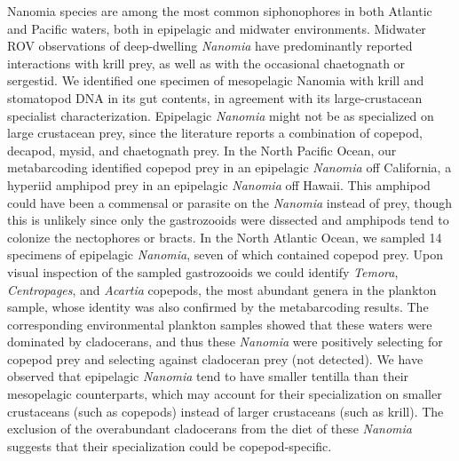 \documentclass[12pt,]{article}
\begin{document}
Nanomia species are among the most common siphonophores in both Atlantic and Pacific waters, both in epipelagic and midwater environments. Midwater ROV observations of deep-dwelling \emph{Nanomia} have predominantly reported interactions with krill prey, as well as with the occasional chaetognath or sergestid. We identified one specimen of mesopelagic Nanomia with krill and stomatopod DNA in its gut contents, in agreement with its large-crustacean specialist characterization. Epipelagic \emph{Nanomia} might not be as specialized on large crustacean prey, since the literature reports a combination of copepod, decapod, mysid, and chaetognath prey. In the North Pacific Ocean, our metabarcoding identified copepod prey in an epipelagic \emph{Nanomia} off California, a hyperiid amphipod prey in an epipelagic \emph{Nanomia} off Hawaii. This amphipod could have been a commensal or parasite on the \emph{Nanomia} instead of prey, though this is unlikely since only the gastrozooids were dissected and amphipods tend to colonize the nectophores or bracts. In the North Atlantic Ocean, we sampled 14 specimens of epipelagic \emph{Nanomia}, seven of which contained copepod prey. Upon visual inspection of the sampled gastrozooids we could identify \emph{Temora}, \emph{Centropages}, and \emph{Acartia} copepods, the most abundant genera in the plankton sample, whose identity was also confirmed by the metabarcoding results. The corresponding environmental plankton samples showed that these waters were dominated by cladocerans, and thus these \emph{Nanomia} were positively selecting for copepod prey and selecting against cladoceran prey (not detected). We have observed that epipelagic \emph{Nanomia} tend to have smaller tentilla than their mesopelagic counterparts, which may account for their specialization on smaller crustaceans (such as copepods) instead of larger crustaceans (such as krill). The exclusion of the overabundant cladocerans from the diet of these \emph{Nanomia} suggests that their specialization could be copepod-specific.
\end{document}
